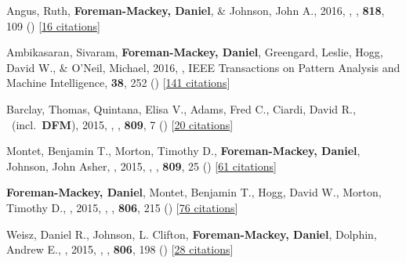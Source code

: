 \item[{\color{numcolor}\scriptsize15}] Angus, Ruth, \textbf{Foreman-Mackey, Daniel}, \& Johnson, John A., 2016, , \apj, \textbf{818}, 109 () [\href{http://adsabs.harvard.edu/abs/2016ApJ...818..109A}{16 citations}]

\item[{\color{numcolor}\scriptsize14}] Ambikasaran, Sivaram, \textbf{Foreman-Mackey, Daniel}, Greengard, Leslie, Hogg, David W., \& O'Neil, Michael, 2016, , IEEE Transactions on Pattern Analysis and Machine Intelligence, \textbf{38}, 252 () [\href{https://scholar.google.com/scholar?cites=4840899390891567426,9641158393712381489}{141 citations}]

\item[{\color{numcolor}\scriptsize13}] Barclay, Thomas, Quintana, Elisa V., Adams, Fred C., Ciardi, David R., \etal\ (incl.\ \textbf{DFM}), 2015, , \apj, \textbf{809}, 7 () [\href{http://adsabs.harvard.edu/abs/2015ApJ...809....7B}{20 citations}]

\item[{\color{numcolor}\scriptsize12}] Montet, Benjamin T., Morton, Timothy D., \textbf{Foreman-Mackey, Daniel}, Johnson, John Asher, \etal, 2015, , \apj, \textbf{809}, 25 () [\href{http://adsabs.harvard.edu/abs/2015ApJ...809...25M}{61 citations}]

\item[{\color{numcolor}\scriptsize11}] \textbf{Foreman-Mackey, Daniel}, Montet, Benjamin T., Hogg, David W., Morton, Timothy D., \etal, 2015, , \apj, \textbf{806}, 215 () [\href{http://adsabs.harvard.edu/abs/2015ApJ...806..215F}{76 citations}]

\item[{\color{numcolor}\scriptsize10}] Weisz, Daniel R., Johnson, L. Clifton, \textbf{Foreman-Mackey, Daniel}, Dolphin, Andrew E., \etal, 2015, , \apj, \textbf{806}, 198 () [\href{http://adsabs.harvard.edu/abs/2015ApJ...806..198W}{28 citations}]

